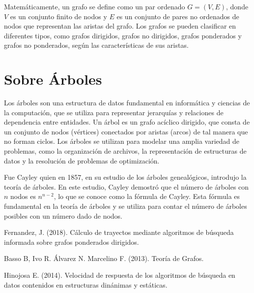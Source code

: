 \documentclass[11pt, a4paper]{article}
\begin{document}
  Matemáticamente, un grafo se define como un par ordenado $G = (V, E)$, donde $V$ es un conjunto finito de nodos y $E$ es un conjunto de pares no ordenados de nodos que representan las aristas del grafo. Los grafos se pueden clasificar en diferentes tipos, como grafos dirigidos, grafos no dirigidos, grafos ponderados y grafos no ponderados, según las características de sus aristas.

\section{Sobre Árboles}

  Los árboles son una estructura de datos fundamental en informática y ciencias de la computación, que se utiliza para representar jerarquías y relaciones de dependencia entre entidades. Un árbol es un grafo acíclico dirigido, que consta de un conjunto de nodos (vértices) conectados por aristas (arcos) de tal manera que no forman ciclos. Los árboles se utilizan para modelar una amplia variedad de problemas, como la organización de archivos, la representación de estructuras de datos y la resolución de problemas de optimización.

  Fue Cayley quien en 1857, en su estudio de los árboles genealógicos, introdujo la teoría de árboles. En este estudio, Cayley demostró que el número de árboles con $n$ nodos es $n^{n-2}$, lo que se conoce como la fórmula de Cayley. Esta fórmula es fundamental en la teoría de árboles y se utiliza para contar el número de árboles posibles con un número dado de nodos.

\newpage

\begin{thebibliography}{9}

  Fernandez, J. (2018). Cálculo de trayectos mediante algoritmos de búsqueda informada sobre grafos ponderados dirigidos.

  Basso B, Ivo R. Álvarez N. Marcelino F. (2013). Teoría de Grafos.

  Hinojosa E. (2014). Velocidad de respuesta de los algoritmos de búsqueda en datos contenidos en estructuras dinánimas y estáticas.

\end{thebibliography}
\end{document}
